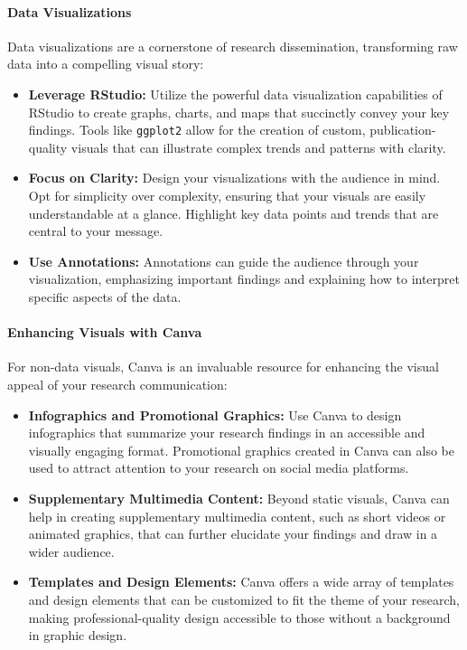 \documentclass[
]{book}
\begin{document}
\hypertarget{data-visualizations}{%
\paragraph{Data Visualizations}\label{data-visualizations}}

Data visualizations are a cornerstone of research dissemination, transforming raw data into a compelling visual story:

\begin{itemize}
\item
  \textbf{Leverage RStudio:} Utilize the powerful data visualization capabilities of RStudio to create graphs, charts, and maps that succinctly convey your key findings. Tools like \texttt{ggplot2} allow for the creation of custom, publication-quality visuals that can illustrate complex trends and patterns with clarity.
\item
  \textbf{Focus on Clarity:} Design your visualizations with the audience in mind. Opt for simplicity over complexity, ensuring that your visuals are easily understandable at a glance. Highlight key data points and trends that are central to your message.
\item
  \textbf{Use Annotations:} Annotations can guide the audience through your visualization, emphasizing important findings and explaining how to interpret specific aspects of the data.
\end{itemize}

\hypertarget{enhancing-visuals-with-canva}{%
\paragraph{Enhancing Visuals with Canva}\label{enhancing-visuals-with-canva}}

For non-data visuals, Canva is an invaluable resource for enhancing the visual appeal of your research communication:

\begin{itemize}
\item
  \textbf{Infographics and Promotional Graphics:} Use Canva to design infographics that summarize your research findings in an accessible and visually engaging format. Promotional graphics created in Canva can also be used to attract attention to your research on social media platforms.
\item
  \textbf{Supplementary Multimedia Content:} Beyond static visuals, Canva can help in creating supplementary multimedia content, such as short videos or animated graphics, that can further elucidate your findings and draw in a wider audience.
\item
  \textbf{Templates and Design Elements:} Canva offers a wide array of templates and design elements that can be customized to fit the theme of your research, making professional-quality design accessible to those without a background in graphic design.
\end{itemize}
\end{document}
